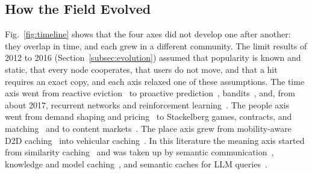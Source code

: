 \subsection{How the Field Evolved}
Fig.~\ref{fig:timeline} shows that the four axes did not develop one after another: they overlap in time, and each grew in a different community. The limit results of 2012 to 2016 (Section~\ref{subsec:evolution}) assumed that popularity is known and static, that every node cooperates, that users do not move, and that a hit requires an exact copy, and each axis relaxed one of these assumptions. The time axis went from reactive eviction~\cite{che2002hierarchical} to proactive prediction~\cite{bastug2014living}, bandits~\cite{blasco2014learning,muller2017context}, and, from about 2017, recurrent networks and reinforcement learning~\cite{chen2017echo,sadeghi2018optimal,zhong2018drl}. The people axis went from demand shaping and pricing~\cite{tadrous2015proactive} to Stackelberg games, contracts, and matching~\cite{hamidouche2014matching,chen2016d2dstackelberg,hamidouche2016contracts} and to content markets~\cite{hosny2015marketplace,alotaibi2015game}. The place axis grew from mobility-aware D2D caching~\cite{hosny2016impact,wang2017mobility} into vehicular caching~\cite{alnagar2019city,qiao2020drl}. In this literature the meaning axis started from similarity caching~\cite{chierichetti2009similarity,garetto2020similarity} and was taken up by semantic communication~\cite{xie2021deepsc,gunduz2023beyond}, knowledge and model caching~\cite{yu2023semcache,zheng2024knowledge}, and semantic caches for LLM queries~\cite{bang2023gptcache,gill2024meancache,li2024scalm}.

